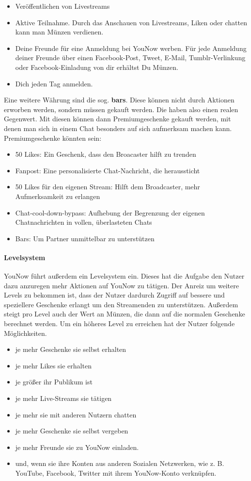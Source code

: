 \begin{itemize}
	\item Veröffentlichen von Livestreams
	\item Aktive Teilnahme. Durch das Anschauen von Livestreams, Liken oder chatten kann man Münzen verdienen.
	\item Deine Freunde für eine Anmeldung bei YouNow werben. Für jede Anmeldung deiner Freunde über einen Facebook-Post, Tweet, E-Mail, Tumblr-Verlinkung oder Facebook-Einladung von dir erhältst Du Münzen. 
	\item Dich jeden Tag anmelden.
\end{itemize} 

Eine weitere Währung sind die sog. \textbf{bars}. Diese können nicht durch Aktionen erworben werden, sondern müssen gekauft werden. Die haben also einen realen Gegenwert. Mit diesen können dann Premiumgeschenke gekauft werden, mit denen man sich in einem Chat besonders auf sich aufmerksam machen kann. Premiumgeschenke könnten sein:

\begin{itemize}
	\item 50 Likes: Ein Geschenk, dass den Broacaster hilft zu trenden
	\item Fanpost: Eine personalisierte Chat-Nachricht, die heraussticht 
	\item 50 Likes für den eigenen Stream: Hilft dem Broadcaster, mehr Aufmerksamkeit zu erlangen
	\item Chat-cool-down-bypass: Aufhebung der Begrenzung der eigenen Chatnachrichten in vollen, überlasteten Chats
	\item Bars: Um Partner unmittelbar zu unterstützen
\end{itemize}

\paragraph{Levelsystem}
YouNow führt außerdem ein Levelsystem ein. Dieses hat die Aufgabe den Nutzer dazu anzuregen mehr Aktionen auf YouNow zu tätigen. Der Anreiz um weitere Levels zu bekommen ist, dass der Nutzer dardurch Zugriff auf bessere und speziellere Geschenke erlangt um den Streamenden zu unterstützen. Außerdem steigt pro Level auch der Wert an Münzen, die dann auf die normalen Geschenke berechnet werden. 
Um ein höheres Level zu erreichen hat der Nutzer folgende Möglichkeiten.

\begin{itemize}
	\item je mehr Geschenke sie selbst erhalten
	\item je mehr Likes sie erhalten
	\item je größer ihr Publikum ist
	\item je mehr Live-Streams sie tätigen
	\item je mehr sie mit anderen Nutzern chatten
	\item je mehr Geschenke sie selbst vergeben
	\item je mehr Freunde sie zu YouNow einladen.
	\item und, wenn sie ihre Konten aus anderen Sozialen Netzwerken, wie z. B. YouTube, Facebook, Twitter mit ihrem YouNow-Konto verknüpfen.
\end{itemize}
